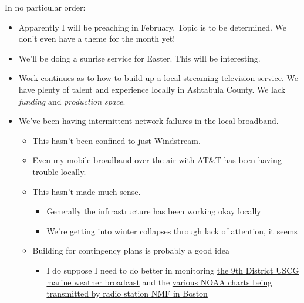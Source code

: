 In no particular order:

\begin{itemize}
\tightlist
\item
  Apparently I will be preaching in February. Topic is to be determined.
  We don't even have a theme for the month yet!
\item
  We'll be doing a sunrise service for Easter. This will be interesting.
\item
  Work continues as to how to build up a local streaming television
  service. We have plenty of talent and experience locally in Ashtabula
  County. We lack \emph{funding} and \emph{production space}.
\item
  We've been having intermittent network failures in the local
  broadband.

  \begin{itemize}
  \tightlist
  \item
    This hasn't been confined to just Windstream.
  \item
    Even my mobile broadband over the air with AT\&T has been having
    trouble locally.
  \item
    This hasn't made much sense.

    \begin{itemize}
    \tightlist
    \item
      Generally the infrrastructure has been working okay locally
    \item
      We're getting into winter collapses through lack of attention, it
      seems
    \end{itemize}
  \item
    Building for contingency plans is probably a good idea

    \begin{itemize}
    \tightlist
    \item
      I do suppose I need to do better in monitoring
      \href{https://www.weather.gov/marine/uscg_broadcasts}{the 9th
      District USCG marine weather broadcast} and the
      \href{https://ocean.weather.gov/shtml/atlsch.php}{various NOAA
      charts being transmitted by radio station NMF in Boston}


\end{itemize}
\end{itemize}
\end{itemize}
